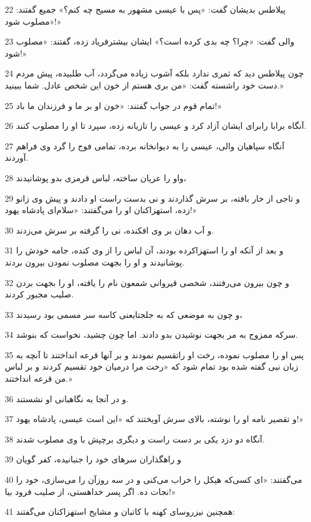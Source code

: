 \par 22 پیلاطس بدیشان گفت: «پس با عیسی مشهور به مسیح چه کنم؟» جمیع گفتند: «مصلوب شود!»
\par 23 والی گفت: «چرا؟ چه بدی کرده است؟» ایشان بیشترفریاد زده، گفتند: «مصلوب شود!»
\par 24 چون پیلاطس دید که ثمری ندارد بلکه آشوب زیاده می‌گردد، آب طلبیده، پیش مردم دست خود راشسته گفت: «من بری هستم از خون این شخص عادل. شما ببینید.»
\par 25 تمام قوم در جواب گفتند: «خون او بر ما و فرزندان ما باد!»
\par 26 آنگاه برابا رابرای ایشان آزاد کرد و عیسی را تازیانه زده، سپرد تا او را مصلوب کنند.
\par 27 آنگاه سپاهیان والی، عیسی را به دیوانخانه برده، تمامی فوج را گرد وی فراهم آوردند.
\par 28 واو را عریان ساخته، لباس قرمزی بدو پوشانیدند،
\par 29 و تاجی از خار بافته، بر سرش گذاردند و نی بدست راست او دادند و پیش وی زانو زده، استهزاکنان او را می‌گفتند: «سلام‌ای پادشاه یهود!»
\par 30 و آب دهان بر وی افکنده، نی را گرفته بر سرش می‌زدند.
\par 31 و بعد از آنکه او را استهزاکرده بودند، آن لباس را از وی کنده، جامه خودش را پوشانیدند و او را بجهت مصلوب نمودن بیرون بردند.
\par 32 و چون بیرون می‌رفتند، شخصی قیروانی شمعون نام را یافته، او را بجهت بردن صلیب مجبور کردند.
\par 33 و چون به موضعی که به جلجتایعنی کاسه سر مسمی بود رسیدند،
\par 34 سرکه ممزوج به مر بجهت نوشیدن بدو دادند. اما چون چشید، نخواست که بنوشد.
\par 35 پس او را مصلوب نموده، رخت او راتقسیم نمودند و بر آنها قرعه انداختند تا آنچه به زبان نبی گفته شده بود تمام شود که «رخت مرا درمیان خود تقسیم کردند و بر لباس من قرعه انداختند.»
\par 36 و در آنجا به نگاهبانی او نشستند.
\par 37 و تقصیر نامه او را نوشته، بالای سرش آویختند که «این است عیسی، پادشاه یهود!»
\par 38 آنگاه دو دزد یکی بر دست راست و دیگری برچپش با وی مصلوب شدند.
\par 39 و راهگذاران سرهای خود را جنبانیده، کفر گویان
\par 40 می‌گفتند: «ای کسی‌که هیکل را خراب می‌کنی و در سه روزآن را می‌سازی، خود را نجات ده. اگر پسر خداهستی، از صلیب فرود بیا!»
\par 41 همچنین نیزروسای کهنه با کاتبان و مشایخ استهزاکنان می‌گفتند:
